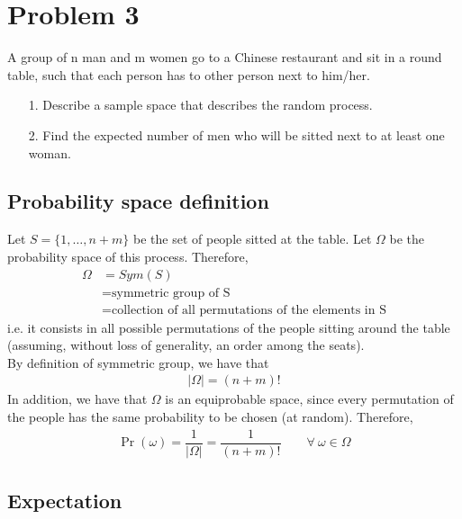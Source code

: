 
\section{Problem 3}

A group of n man and m women go to a Chinese restaurant and sit in a round table,
such that each person has to other person next to him/her.
\begin{itemize}
	\item[1.] Describe a sample space that describes the random process.
	\item[2.] Find the expected number of men who will be sitted next to at least one woman.
\end{itemize} 


\subsection{Probability space definition}

Let $S = \{1, \ldots, n+m\}$ be the set of people sitted at the table. Let $\Omega$ be the probability space of this process. Therefore,
\begin{align*}
	\Omega &= Sym(S)\\
	&= \text{symmetric group of S}\\
	&= \text{collection of all permutations of the elements in S}
\end{align*}
i.e. it consists in all possible permutations of the people sitting around the table (assuming, without loss of generality, an order among the seats).\\
By definition of symmetric group\cite{sym_group}, we have that
\begin{align*}
	|\Omega| = (n+m)!
\end{align*}
In addition, we have that $\Omega$ is an equiprobable space, since every permutation of the people has the same probability to be chosen (at random). Therefore,
\begin{align*}
	\Pr(\omega) = \dfrac{1}{|\Omega|} = \dfrac{1}{(n+m)!} \qquad \forall \ \omega\in\Omega
\end{align*}


\subsection{Expectation}

